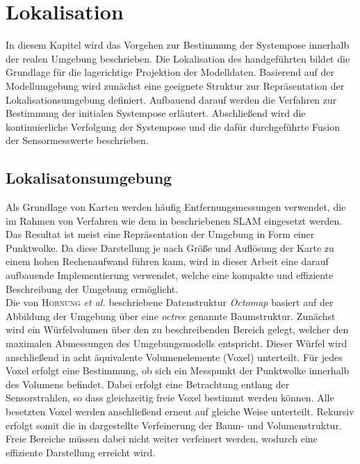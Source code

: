 \chapter{Lokalisation}
\label{chap.loc}
\prever{
}

In diesem Kapitel wird das Vorgehen zur Bestimmung der Systempose innerhalb der realen Umgebung beschrieben. Die Lokalisation des handgeführten  bildet die Grundlage für die lagerichtige Projektion der Modelldaten. Basierend auf der Modellumgebung wird zunächst eine geeignete Struktur zur Repräsentation der Lokalisationsumgebung definiert. Aufbauend darauf werden die Verfahren zur Bestimmung der initialen Systempose erläutert. Abschließend wird die kontinuierliche Verfolgung der Systempose und die dafür durchgeführte Fusion der Sensormesswerte beschrieben.

\section{Lokalisatonsumgebung}
\label{chap.map}
Als Grundlage von Karten werden häufig Entfernungsmessungen verwendet, die im Rahmen von Verfahren wie dem in  beschriebenen SLAM eingesetzt werden. Das Resultat ist meist eine Repräsentation der Umgebung in Form einer Punktwolke. Da diese Darstellung je nach Größe und Auflösung der Karte zu einem hohen Rechenaufwand führen kann, wird in dieser Arbeit eine darauf aufbauende Implementierung \cite{Octomap} verwendet, welche eine kompakte und effiziente Beschreibung der Umgebung ermöglicht.\\

Die von \textsc{Hornung} \textit{et al.} \cite{Hornung2013} beschriebene Datenstruktur \textit{Octomap} basiert auf der Abbildung der Umgebung über eine \textit{octree} genannte Baumstruktur. Zunächst wird ein Würfelvolumen über den zu beschreibenden Bereich gelegt, welcher den maximalen Abmessungen des Umgebungsmodells entspricht. Dieser Würfel wird anschließend in acht äquivalente Volumenelemente (Voxel) unterteilt. Für jedes Voxel erfolgt eine Bestimmung, ob sich ein Messpunkt der Punktwolke innerhalb des Volumens befindet. Dabei erfolgt eine Betrachtung entlang der Sensorstrahlen, so dass gleichzeitig freie Voxel bestimmt werden können. Alle besetzten Voxel werden anschließend erneut auf gleiche Weise unterteilt. Rekursiv erfolgt somit die in  dargestellte Verfeinerung der Baum- und Volumenstruktur. Freie Bereiche müssen dabei nicht weiter verfeinert werden, wodurch eine effiziente Darstellung erreicht wird.\\

